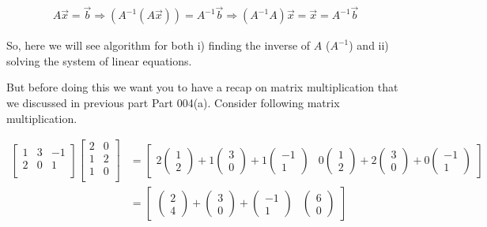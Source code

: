 \documentclass{article}
\begin{document}
\begin{align}
    A\vec{x} = \vec{b} \Rightarrow (A^{-1}(A\vec{x})) = A^{-1}\vec{b} \Rightarrow (A^{-1}A)\vec{x}  = \vec{x} = A^{-1}\vec{b} \nonumber
\end{align}

So, here we will see algorithm for both i) finding the inverse of $A$ ($A^{-1}$) and ii) solving the system of linear equations. 


But before doing this we want you to have a recap on matrix multiplication that we discussed in previous part Part 004(a). Consider following matrix multiplication.

\begin{align}
    \begin{bmatrix}
        1 & 3 & -1\\
        2 & 0 & 1\\
    \end{bmatrix}  \begin{bmatrix}
                        2 & 0\\
                        1 & 2\\
                        1 & 0\\
                  \end{bmatrix} &= \begin{bmatrix} 2\begin{pmatrix} 1 \\2 \end{pmatrix} + 1\begin{pmatrix} 3 \\0        \end{pmatrix} + 1\begin{pmatrix} -1 \\1\end{pmatrix} & 0\begin{pmatrix} 1 \\2 \end{pmatrix} + 2\begin{pmatrix} 3 \\0 \end{pmatrix} + 0\begin{pmatrix} -1 \\1 \end{pmatrix} \end{bmatrix} \nonumber \\ &= \begin{bmatrix}\begin{pmatrix} 2 \\4 \end{pmatrix}+\begin{pmatrix} 3 \\0 \end{pmatrix}+\begin{pmatrix} -1 \\1 \end{pmatrix} & \begin{pmatrix} 6 \\0 \end{pmatrix}\end{bmatrix}\nonumber \\

\end{align}
\end{document}
